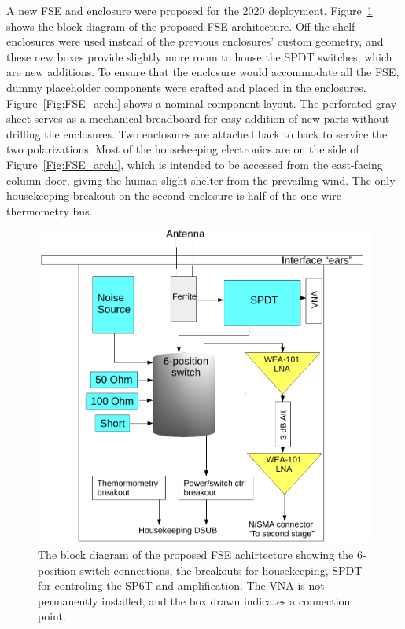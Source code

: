 A new FSE and enclosure were proposed for the 2020 deployment. Figure~\ref{Fig:FSE_rev} shows the block diagram of the proposed FSE architecture. Off-the-shelf enclosures were used instead of the previous enclosures' custom geometry, and these new boxes provide slightly more room to house the SPDT switches, which are new additions. To ensure that the enclosure would accommodate all the FSE, dummy placeholder components were crafted and placed in the enclosures. Figure~\ref{Fig:FSE_archi} shows a nominal component layout. The perforated gray sheet serves as a mechanical breadboard for easy addition of new parts without drilling the enclosures. Two enclosures are attached back to back to service the two polarizations. Most of the housekeeping electronics are on the side of Figure~\ref{Fig:FSE_archi}, which is intended to be accessed from the east-facing column door, giving the human slight shelter from the prevailing wind. The only housekeeping breakout on the second enclosure is half of the one-wire thermometry bus.

\begin{figure}
	\centering
	\includegraphics[width=0.7\linewidth]{Figures/FSE_rev}
	\caption{The block diagram of the proposed FSE achirtecture showing the 6-position switch connections, the breakouts for housekeeping, SPDT for controling the SP6T and amplification. The VNA is not permanently installed, and the box drawn indicates a connection point.}
	\label{Fig:FSE_rev}
\end{figure} 

